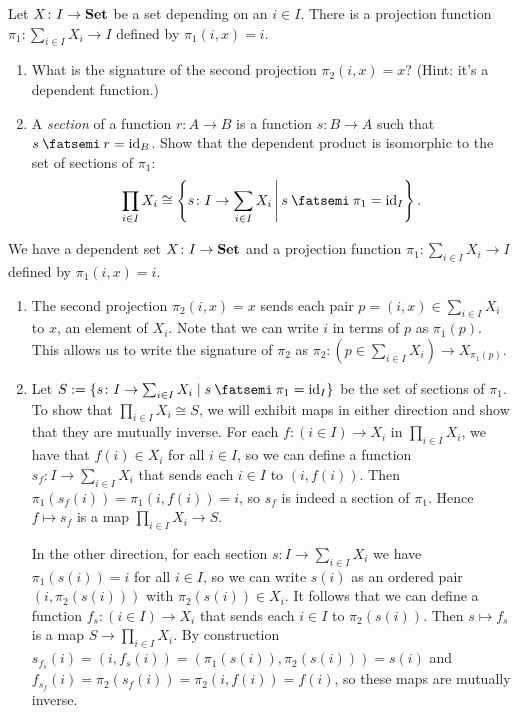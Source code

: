 \documentclass[Book-Poly]{subfiles}
\begin{document}
\begin{exercise}\label{exc.dependent_product_as_sections}
  Let $X \colon I \to \mathbf{Set}$ be a set depending on an $i \in I$. There is a
  projection function
  $\pi_1 \colon \sum_{i \in I} X_i \to I$
  defined by $\pi_1(i, x) = i$.
  \begin{enumerate}
    \item What is the signature of the second projection $\pi_2(i, x) = x$?
    (Hint: it's a dependent function.)
    \item A \emph{section} of a function $r \colon A \to B$ is a function $s \colon B \to A$ such that $s \then r = \id_B$.
    Show that the dependent product is isomorphic to the set of sections of $\pi_1$:
    \[\prod_{i \in I} X_i \cong \left\{s \colon I \to \sum_{i \in I} X_i \,\middle|\, s \then \pi_1 = \id_I\right\}.\]
    \qedhere
  \end{enumerate}
\begin{solution}
We have a dependent set $X \colon I \to \mathbf{Set}$ and a projection function $\pi_1 \colon \sum_{i \in I} X_i \to I$ defined by $\pi_1(i, x) = i$.
\begin{enumerate}
    \item The second projection $\pi_2(i, x) = x$ sends each pair $p = (i, x) \in \sum_{i \in I} X_i$ to $x$, an element of $X_i$.
    Note that we can write $i$ in terms of $p$ as $\pi_1(p)$.
    This allows us to write the signature of $\pi_2$ as $\pi_2 \colon (p \in \sum_{i \in I} X_i) \to X_{\pi_1(p)}$.
    
    \item Let $S := \{s \colon I \to \sum_{i \in I} X_i \mid s \then \pi_1 = \id_I\}$ be the set of sections of $\pi_1$. To show that $\prod_{i \in I} X_i \cong S$, we will exhibit maps in either direction and show that they are mutually inverse.
    For each $f \colon (i \in I) \to X_i$ in $\prod_{i \in I} X_i$, we have that $f(i) \in X_i$ for all $i \in I$, so we can define a function $s_f \colon I \to \sum_{i \in I} X_i$ that sends each $i \in I$ to $(i, f(i))$.
    Then $\pi_1(s_f(i)) = \pi_1(i, f(i)) = i$, so $s_f$ is indeed a section of $\pi_1$.
    Hence $f \mapsto s_f$ is a map $\prod_{i \in I} X_i \to S$.
    
    In the other direction, for each section $s \colon I \to \sum_{i \in I} X_i$ we have $\pi_1(s(i)) = i$ for all $i \in I$, so we can write $s(i)$ as an ordered pair $(i, \pi_2(s(i)))$ with $\pi_2(s(i)) \in X_i$.
    It follows that we can define a function $f_s \colon (i \in I) \to X_i$ that sends each $i \in I$ to  $\pi_2(s(i))$.
    Then $s \mapsto f_s$ is a map $S \to \prod_{i \in I} X_i$.
    By construction $s_{f_s}(i) = (i, f_s(i)) = (\pi_1(s(i)), \pi_2(s(i))) = s(i)$ and $f_{s_f}(i) = \pi_2(s_f(i)) = \pi_2(i, f(i)) = f(i)$, so these maps are mutually inverse.
\end{enumerate}
\end{solution}
\end{exercise}
\end{document}
